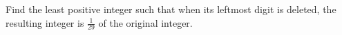 Find the least positive integer such that when its leftmost digit is deleted, the resulting integer is $\frac{1}{29}$ of the original integer.